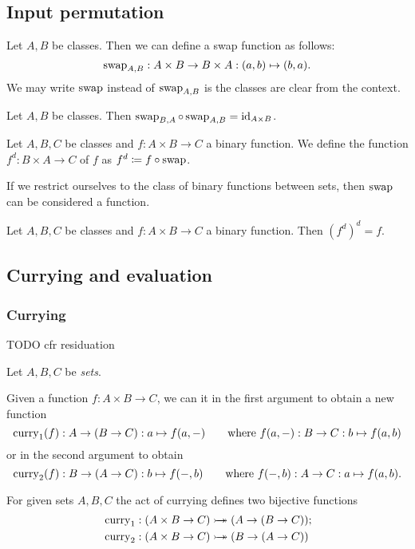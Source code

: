\subsection{Input permutation}

Let $A,B$ be classes. Then we can define a swap function as follows:
\[ \operatorname{swap}_{A,B}: A\times B \to B\times A: (a,b) \mapsto (b,a). \]
We may write $\operatorname{swap}$ instead of $\operatorname{swap}_{A,B}$ is the classes are clear from the context.

\begin{lemma}
Let $A, B$ be classes. Then $\operatorname{swap}_{B,A}\circ \operatorname{swap}_{A,B} = \operatorname{id}_{A\times B}$.
\end{lemma}

\begin{definition}
Let $A, B, C$ be classes and $f: A\times B \to C$ a binary function. We define the  function $f^d: B\times A \to C$ of $f$ as $f^d \coloneqq f\circ \operatorname{swap}$. 
\end{definition}

If we restrict ourselves to the class of binary functions between sets, then $\operatorname{swap}$ can be considered a function.

\begin{lemma}
Let $A, B, C$ be classes and $f: A\times B \to C$ a binary function. Then $(f^d)^d = f$.
\end{lemma}

\subsection{Currying and evaluation}
\subsubsection{Currying}
TODO cfr residuation

\begin{definition}
Let $A,B,C$ be \emph{sets}.

Given a function $f: A\times B \to C$, we can  it in the first argument to obtain a new function
\[ \operatorname{curry}_1(f): A \to (B\to C): a\mapsto f(a,-) \qquad \text{where $f(a,-): B \to C: b\mapsto f(a,b)$} \]
or in the second argument to obtain
\[ \operatorname{curry}_2(f): B \to (A\to C): b\mapsto f(-,b) \qquad \text{where $f(-,b): A \to C: a\mapsto f(a,b)$}. \]
\end{definition}
\begin{lemma}
For given sets $A,B,C$ the act of currying defines two bijective functions
\begin{align*}
&\operatorname{curry}_1: (A\times B \to C) \mathrel{\rightarrowtail\kern-1.9ex\twoheadrightarrow} (A \to (B\to C)); \\
&\operatorname{curry}_2: (A\times B \to C) \mathrel{\rightarrowtail\kern-1.9ex\twoheadrightarrow} (B \to (A\to C))
\end{align*}
\end{lemma}

